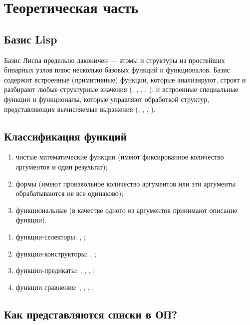 \documentclass[a4paper]{report}
\begin{document}
\section*{Теоретическая часть}

\subsection*{Базис Lisp}

Базис Лиспа предельно лаконичен — атомы и структуры из простейших бинарных узлов плюс несколько базовых функций и функционалов.
Базис содержит встроенные (примитивные) функции, которые анализируют, строят и разбирают любые структурные значения (, , , , ), и встроенные специальные функции и функционалы, которые управляют обработкой структур, представляющих вычисляемые выражения (, , , ).

\subsection*{Классификация функций}

\begin{enumerate}
	\item чистые математические функции (имеют фиксированное количество аргументов и один результат);
	\item формы (имеют произвольное количество аргументов или эти аргументы обрабатываются не все одинаково);
	\item функциональные (в качестве одного из аргументов принимают описание функции).
\end{enumerate}

\begin{enumerate}
	\item функции-селекторы: , ;
	\item функции-конструкторы: , ;
	\item функции-предикаты: , , , ;
	\item функции сравнения: , , , .
\end{enumerate}

\subsection*{Как представляются списки в ОП?}
\end{document}
